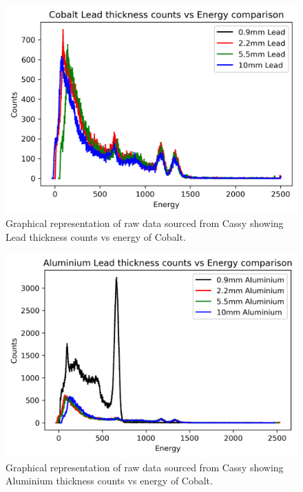 \documentclass[12pt]{article}
\begin{document}
\begin{multicols}{2}
\begin{figure}[H]
\centering
\includegraphics[scale=0.6]{Images/CobaltLeadEnergyCounts.png}
\caption{Graphical representation of raw data sourced from Cassy showing Lead thickness counts vs energy of Cobalt.}
\label{Cobalt Lead Energy Counts}
\end{figure}

\begin{figure}[H]
\centering
\includegraphics[scale=0.6]{Images/CobaltAluminiumEnergyCounts.png}
\caption{Graphical representation of raw data sourced from Cassy showing Aluminium thickness counts vs energy of Cobalt.}
\label{Cobalt Alu Energy Counts}
\end{figure}
\end{multicols}
\end{document}
